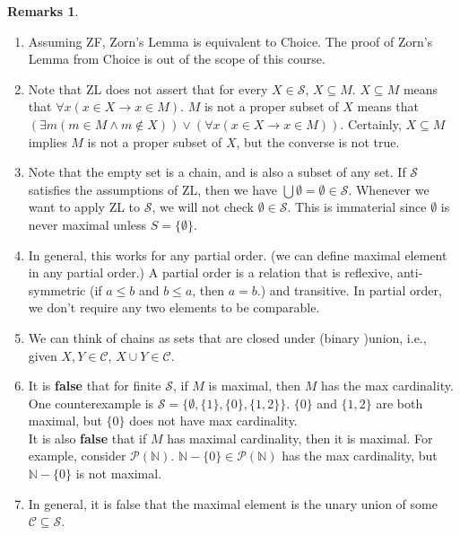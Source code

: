 \documentclass[14pt]{article}
\theoremstyle{definition}
\newtheorem*{remark}{Remarks}
\newcommand{\bb}[1]{\mathbb{#1}}
\begin{document}
\begin{remark} \hfill
    \begin{enumerate}
        \item  Assuming ZF, Zorn's Lemma is equivalent to Choice. The proof of Zorn's Lemma
        from Choice is out of the scope of this course.
        \item  Note that ZL does not assert that for every $X\in \mathcal{S}$, 
        $X\subseteq M$. $X\subseteq M$ means that $\forall x(x\in X\to x\in M)$. 
        $M$ is not a proper subset of $X$ means that $(\exists m(m\in M\wedge m\not\in X))
        \vee (\forall x(x\in X\to x\in M))$. Certainly,  $X\subseteq M$ implies 
        $M$ is not a proper subset of $X$, but the converse is not true.
        \item  Note that the empty set is a chain, and is also a subset of any set.
        If $\mathcal{S}$ satisfies the assumptions of ZL, then we have $\bigcup \emptyset
        =\emptyset \in \mathcal{S}$. Whenever we want to apply ZL to $\mathcal{S}$, we will
        not check $\emptyset \in \mathcal{ S}$. This is immaterial since $\emptyset $ is 
        never maximal unless $S=\{\emptyset\}$.
        \item In general, this works for any partial order. (we can define maximal element
        in any partial order.) A partial order is a relation that is reflexive,
        anti-symmetric (if $a\leq b$ and $b\leq a$, then $a=b$.) and transitive. In partial 
        order, we don't require any two elements to be comparable.
        \item  We can think of chains as sets that are closed under (binary )union, i.e., 
        given $X, Y\in \mathcal{C}$, $X\cup Y\in \mathcal{C}$.
        \item  It is \textbf{false} that for finite $\mathcal{S}$, if $M$ is maximal, then
        $M$ has the max cardinality.\\ 
        One counterexample is $\mathcal{S}=\{\emptyset, \{1\}, \{0\}, \{1,2\}\}$. $\{0\}$ and 
        $\{1,2\}$ are both maximal, but $\{0\}$ does not have max cardinality.\\
        It is also \textbf{false} that if $M$ has maximal cardinality, then it is maximal. 
        For example, consider $\mathcal{P}(\bb{N})$.  $\bb{N}-\{0\}\in 
        \mathcal{P}(\bb{N})$ has the max cardinality,  but $\bb{N}-\{0\}$ is not maximal.
        \item In general, it is false that the maximal element is the unary union of some 
        $\mathcal{C}\subseteq \mathcal{S}$.
    \end{enumerate}
\end{remark}
\end{document}
